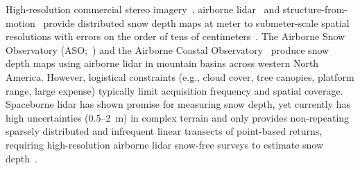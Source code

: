 \documentclass[journal abbreviation, manuscript]{copernicus}
\begin{document}
High-resolution commercial stereo imagery~\citep{Shaw.2020, Hu.2023}, airborne lidar~\citep{Currier.2019, Deems.2013} and structure-from-motion~\citep{Bühler.2016, Nolan.2015, Miller.2022, Meyer.2022} provide distributed snow depth maps at meter to submeter-scale spatial resolutions with errors on the order of tens of centimeters~\citep{McGrath.2019, Currier.2019, Deems.2013}. The Airborne Snow Observatory (ASO;~\citealp{Painter.2016}) and the Airborne Coastal Observatory~\citep{Geospatial2021Snow} produce snow depth maps using airborne lidar in mountain basins across western North America. However, logistical constraints (e.g., cloud cover, tree canopies, platform range, large expense) typically limit acquisition frequency and spatial coverage. Spaceborne lidar has shown promise for measuring snow depth, yet currently has high uncertainties (0.5--2~m) in complex terrain and only provides non-repeating sparsely distributed and infrequent linear transects of point-based returns, requiring high-resolution airborne lidar snow-free surveys to estimate snow depth~\citep{Enderlin.2022,Deschamps-Berger.2023, Besso.2024}.
\end{document}
